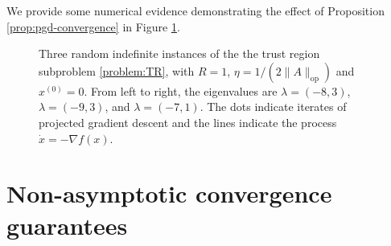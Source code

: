\documentclass[11pt]{article}
\begin{document}
We provide some numerical evidence demonstrating the effect of Proposition \ref{prop:pgd-convergence} in
Figure \ref{fig:convergence-2D}.
\begin{figure}
    \centering
    \caption{Three random indefinite instances of the the trust region subproblem \eqref{problem:TR}, with $R = 1$, $\eta = 1/(2\|A\|_{\mathrm{op}})$ and
      $x^{(0)} = 0$. From left to right, the eigenvalues are $\lambda = (-8, 3)$, $\lambda = (-9, 3)$, and $\lambda = (-7,1)$.
      The dots indicate iterates of projected gradient descent and the lines indicate the process $\dot x = -\nabla f(x)$.}
    \label{fig:convergence-2D}
\end{figure}

\section{Non-asymptotic convergence guarantees}
\end{document}
